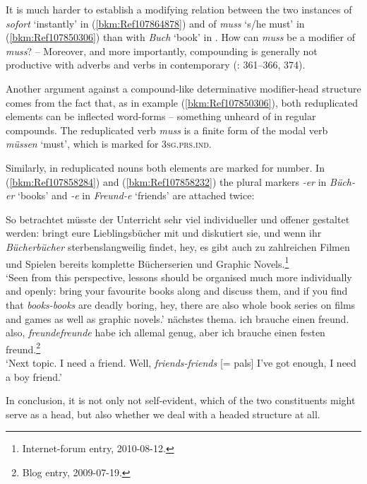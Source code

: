 \documentclass[output=paper
  ,nobabel
  ,draftmode
  ,colorlinks, citecolor=brown
]{langscibook}
\begin{document}
\noindent
It is much harder to establish a modifying relation between the two instances of \emph{sofort}
`instantly' in (\ref{bkm:Ref107864878}) and of \emph{muss} `s/he must' in (\ref{bkm:Ref107850306})
than with \emph{Buch} `book' in . How can \emph{muss} be a modifier of \emph{muss}?
– Moreover, and more importantly, compounding is generally not productive with adverbs and verbs
in contemporary  (\citealt{FleischerBarz2012}: 361–366, 374).

Another argument against a compound-like determinative modifier-head structure comes from the fact
that, as in example (\ref{bkm:Ref107850306}), both reduplicated elements can be inflected word-forms
– something unheard of in regular compounds. The reduplicated verb \emph{muss} is a finite form of
the modal verb \emph{müssen} `must', which is marked for 3\textsc{sg.prs.ind}.

Similarly, in reduplicated nouns both elements are marked for number. In (\ref{bkm:Ref107858284})
and (\ref{bkm:Ref107858232}) the plural markers \emph{-er} in \emph{Büch-er} `books' and
\emph{-e} in \emph{Freund-e} `friends' are attached twice:



\ea
\label{bkm:Ref107858284}%
So betrachtet müsste der Unterricht sehr viel individueller und offener gestaltet werden: bringt eure Lieblingsbücher mit und diskutiert sie, und wenn ihr \emph{Bücherbücher} sterbenslangweilig findet, hey, es gibt auch zu zahlreichen Filmen und Spielen bereits komplette Bücherserien und Graphic Novels.\footnote{Internet-forum entry, 2010-08-12.}\\
`Seen from this perspective, lessons should be organised much more individually and openly: bring your favourite books along and discuss them, and if you find that \emph{books-books} are deadly boring, hey, there are also whole book series on films and games as well as graphic novels.'
\z
\ea
\label{bkm:Ref107858232}%
nächstes thema. ich brauche einen freund. also, \emph{freundefreunde} habe ich allemal genug, aber ich brauche einen festen freund.\footnote{
Blog entry, 2009-07-19.}\\
`Next topic. I need a friend. Well, \emph{friends-friends} [= pals] I've got enough, I need a boy friend.'
\z

\noindent
In conclusion, it is not only not self-evident, which of the two constituents might serve as a head,
but also whether we deal with a headed structure at all.
\end{document}
